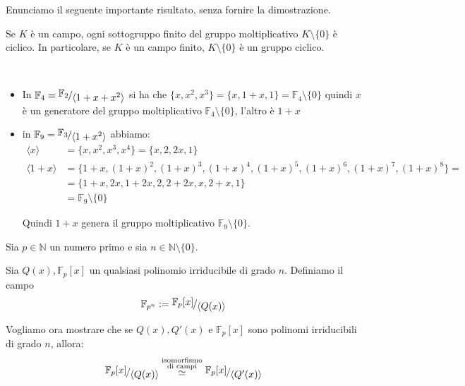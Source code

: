 \documentclass[../main.tex]{subfiles}
\begin{document}
Enunciamo il seguente importante risultato, senza fornire la dimostrazione.

\begin{proposition}
    Se $K$ è un campo, ogni sottogruppo finito del gruppo moltiplicativo $K \setminus \{0\}$ è ciclico. In particolare, se $K$ è un campo finito, $K \setminus \{0\}$ è un gruppo ciclico.
\end{proposition}

\begin{example}\
    \begin{itemize}
        \item In $\mathbb{F}_4 = \nicefrac{\mathbb{F}_2}{\langle1 + x + x^2\rangle}$ si ha che $\{ x, x^2, x^3\} = \{ x, 1 + x, 1\} = \mathbb{F}_4 \setminus \{0\}$ quindi $x$ è un generatore del gruppo moltiplicativo $\mathbb{F}_4 \setminus \{0\}$, l'altro è $1 + x$
        \item in $\mathbb{F}_9 = \nicefrac{\mathbb{F}_3}{\langle1 + x^2\rangle}$ abbiamo:
              \begin{align*}
                  \langle x\rangle    & = \{x, x^2, x^3, x^4\} = \{x, 2, 2x,1\}                                                    \\
                  \langle1 + x\rangle & = \{1 + x, (1 + x)^2, (1 + x)^3, (1 + x)^4, (1 + x)^5, (1 + x)^6, (1 + x)^7, (1 + x)^8\} = \\
                                      & = \{1 + x, 2x, 1 + 2x, 2, 2 + 2x, x, 2 + x, 1 \}                                           \\
                                      & = \mathbb{F}_9 \setminus \{0\}
              \end{align*}

              Quindi $1 + x$ genera il gruppo moltiplicativo $\mathbb{F}_9 \setminus \{0\}$.
    \end{itemize}
\end{example}

Sia $p \in \mathbb{N}$ un numero primo e sia $n \in \mathbb{N} \setminus \{0\}$.

Sia $Q(x), \mathbb{F}_p[x]$ un qualsiasi polinomio irriducibile di grado $n$. Definiamo il campo
\begin{equation*}
    \mathbb{F}_{p^n} := \nicefrac{\mathbb{F}_p[x]}{\langle Q(x)\rangle}
\end{equation*}

Vogliamo ora mostrare che se $Q(x), Q'(x)$ e $\mathbb{F}_p[x]$ sono polinomi irriducibili di grado $n$, allora:
\begin{equation*}
    \nicefrac{\mathbb{F}_p[x]}{\langle Q(x)\rangle} \overset{\substack{\text{isomorfismo}\\\text{di campi}}}{\simeq} \nicefrac{\mathbb{F}_p[x]}{\langle Q'(x)\rangle}
\end{equation*}
\end{document}
